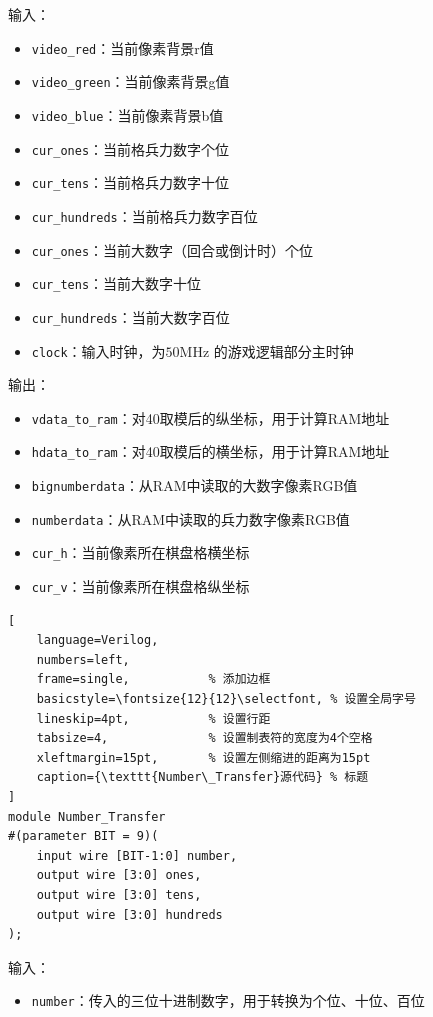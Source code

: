 输入：
\begin{itemize}
    \item \texttt{video\_red}：当前像素背景r值
    \item \texttt{video\_green}：当前像素背景g值
    \item \texttt{video\_blue}：当前像素背景b值
    \item \texttt{cur\_ones}：当前格兵力数字个位 
    \item \texttt{cur\_tens}：当前格兵力数字十位 
    \item \texttt{cur\_hundreds}：当前格兵力数字百位 
    \item \texttt{cur\_ones}：当前大数字（回合或倒计时）个位 
    \item \texttt{cur\_tens}：当前大数字十位 
    \item \texttt{cur\_hundreds}：当前大数字百位 
    \item \texttt{clock}：输入时钟，为$50 \text{MHz}$ 的游戏逻辑部分主时钟
\end{itemize}


输出：
\begin{itemize}
    \item \texttt{vdata\_to\_ram}：对40取模后的纵坐标，用于计算RAM地址
    \item \texttt{hdata\_to\_ram}：对40取模后的横坐标，用于计算RAM地址
    \item \texttt{bignumberdata}：从RAM中读取的大数字像素RGB值
    \item \texttt{numberdata}：从RAM中读取的兵力数字像素RGB值
    \item \texttt{cur\_h}：当前像素所在棋盘格横坐标
    \item \texttt{cur\_v}：当前像素所在棋盘格纵坐标
\end{itemize}

\begin{lstlisting}[
    language=Verilog,
    numbers=left,
    frame=single,           % 添加边框
    basicstyle=\fontsize{12}{12}\selectfont, % 设置全局字号
    lineskip=4pt,           % 设置行距
    tabsize=4,              % 设置制表符的宽度为4个空格
    xleftmargin=15pt,       % 设置左侧缩进的距离为15pt
    caption={\texttt{Number\_Transfer}源代码} % 标题
] 
module Number_Transfer
#(parameter BIT = 9)(
	input wire [BIT-1:0] number,
	output wire [3:0] ones,
	output wire [3:0] tens,
	output wire [3:0] hundreds
);
\end{lstlisting}

输入：
\begin{itemize}
    \item \texttt{number}：传入的三位十进制数字，用于转换为个位、十位、百位
\end{itemize}

